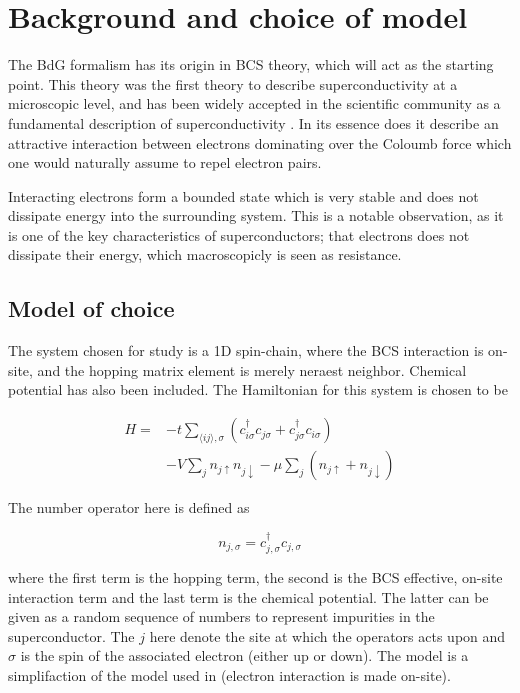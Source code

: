 \documentclass[11pt]{article}
\begin{document}
\section{Background and choice of model}\label{sec:background}

The BdG formalism has its origin in BCS theory, which will act as the starting point. This theory was the first theory to describe superconductivity at a microscopic level, and has been widely accepted in the scientific community as a fundamental description of superconductivity \cite{girvinModernCondensedMatter2019, sharmaReviewTheoriesSuperconductivity2015}. In its essence does it describe an attractive interaction between electrons dominating over the Coloumb force which one would naturally assume to repel electron pairs. 

Interacting electrons form a bounded state which is very stable and does not dissipate energy into the surrounding system. This is a notable observation, as it is one of the key characteristics of superconductors; that electrons does not dissipate their energy, which macroscopicly is seen as resistance.

\subsection{Model of choice}

The system chosen for study is a 1D spin-chain, where the BCS interaction is on-site, and the hopping matrix element is merely neraest neighbor. Chemical potential has also been included. The Hamiltonian for this system is chosen to be 

\begin{align}\label{eq:model}
	H = &-t \sum_{\langle i j\rangle, \sigma}\left(c_{i \sigma}^{\dagger} c_{j \sigma} + c_{j \sigma}^{\dagger} c_{i \sigma}\right) \nonumber \\ 
	    &- V \sum_j n_{j \uparrow} n_{j \downarrow} -\mu \sum_j\left(n_{j \uparrow}+n_{j \downarrow}\right) 
\end{align}

The number operator here is defined as

\begin{equation}
	n_{j, \sigma} = c_{j, \sigma}^\dagger c_{j, \sigma}
\end{equation}

where the first term is the hopping term, the second is the BCS effective, on-site interaction term and the last term is the chemical potential. The latter can be given as a random sequence of numbers to represent impurities in the superconductor.  The $j$ here denote the site at which the operators acts upon and $\sigma$ is the spin of the associated electron (either up or down). The model is a simplifaction of the model used in \cite{zhangChiralPwaveSuperconducting2019} (electron interaction is made on-site). 
\end{document}
